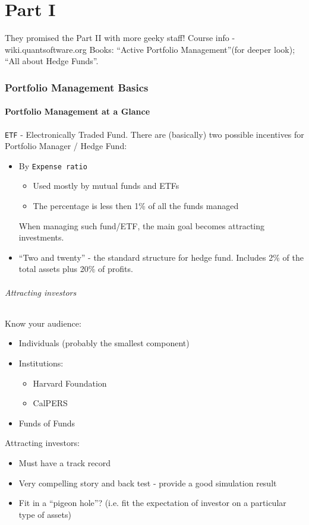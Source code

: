 \documentclass{scrartcl}
\newcommand{\term}[1]{\verb~#1~} %
\begin{document}
\part{Part I}
\label{part:Intro}
They promised the Part II with more geeky staff! Course info -
wiki.quantsoftware.org Books: ``Active Portfolio Management''(for deeper look);
``All about Hedge Funds''.

\section{Portfolio Management Basics}
\label{sec:Basics}
\subsection{Portfolio Management at a Glance}
\label{sec:PortfolioManagement}
\term{ETF} - Electronically Traded Fund. There are (basically) two possible
incentives for Portfolio Manager / Hedge Fund:
\begin{itemize}
\item By \term{Expense ratio}
  \begin{itemize}
  \item Used mostly by mutual funds and ETFs
  \item The percentage is less then 1\% of all the funds managed
  \end{itemize}
  When managing such fund/ETF, the main goal becomes attracting investments.
\item ``Two and twenty'' - the standard structure for hedge fund. Includes 2\%
  of the total assets plus 20\% of profits.
\end{itemize}

\paragraph{Attracting investors}
Know your audience:
\begin{itemize}
\item Individuals (probably the smallest component)
\item Institutions:
  \begin{itemize}
  \item Harvard Foundation
  \item CalPERS
  \end{itemize}
\item Funds of Funds
\end{itemize}

Attracting investors:
\begin{itemize}
\item Must have a track record
\item Very compelling story and back test - provide a good simulation result
\item Fit in a ``pigeon hole''? (i.e. fit the expectation of investor on a
  particular type of assets)
\end{itemize}
\end{document}
